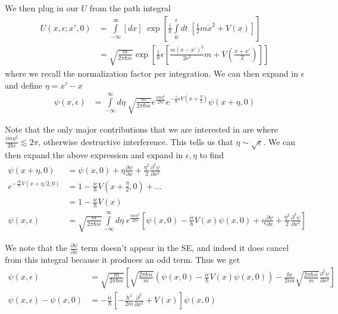 \documentclass[10pt]{report}
\newcommand{\pd}[2]{\frac{\partial #1}{\partial#2}}
\newcommand{\ptd}[2]{\frac{\partial^2 #1}{\partial#2^2}}
\begin{document}
We then plug in our $U$ from the path integral
\begin{align}
    U(x,\epsilon; x',0) &= \int\limits_{-\infty}^{\infty}[dx]\;\exp\left[ \frac{i}{\hbar}\int\limits_{0}^{\epsilon}dt\;\left[ \frac{1}{2}m\dot{x}^2 + V(x) \right] \right]\\
    &= \sqrt{\frac{m}{2\pi\hbar i\epsilon}}\exp\left[ \frac{i}{\hbar}\epsilon\left[ \frac{m(x-x')^2}{2\epsilon^2}m + V\left( \frac{x+x'}{2} \right) \right] \right]
\end{align}
where we recall the normalization factor per integration. We can then expand in $\epsilon$ and define $\eta = x' - x$
\begin{align}
    \psi(x,\epsilon) &= \int\limits_{-\infty}^{\infty}d\eta\;\sqrt{\frac{m}{2\pi\hbar i\epsilon}}e^{\frac{im\eta^2}{2\hbar\epsilon}} e^{-\frac{i}{\hbar}\epsilon V\left( x + \frac{\eta}{2} \right)}\psi(x + \eta,0)
\end{align}

Note that the only major contributions that we are interested in are where $\frac{im\eta^2}{2\hbar\epsilon} \lesssim 2\pi$, otherwise destructive interference. This tells us that $\eta \sim \sqrt{\epsilon}$. We can then expand the above expression and expand in $\epsilon,\eta$ to find
\begin{align}
    \psi(x + \eta,0) &= \psi(x,0) + \eta\pd{\psi}{x} + \frac{\eta^2}{2}\ptd{\psi}{x}\\
    e^{-\frac{i\hbar}{\epsilon }V(x + \eta/2,0)} &= 1 - \frac{i\epsilon}{\hbar}V\left( x + \frac{\eta}{2},0 \right) + \dots\\
    &= 1 - \frac{i\epsilon}{\hbar}V(x)\\
    \psi(x,\epsilon) &= \sqrt{\frac{m}{2\pi\hbar i\epsilon}}\int\limits_{-\infty}^{\infty}d\eta\;e^{\frac{im\eta^2}{2\hbar\epsilon}}\left[ \psi(x,0) - \frac{i\epsilon}{\hbar}V(x) \psi(x,0) + \eta \pd{\psi}{x} + \frac{\eta^2}{2}\ptd{\psi}{x}\right]
\end{align}

We note that the $\pd{\psi}{x}$ term doesn't appear in the SE, and indeed it does cancel from this integral because it produces an odd term. Thus we get
\begin{align}
    \psi(x,\epsilon) &= \sqrt{\frac{m}{2\pi\hbar i\epsilon}}\left[ \sqrt{\frac{2\pi \hbar i\epsilon}{m}}\left( \psi(x,0) - \frac{i\epsilon}{\hbar}V(x)\psi(x,0) \right) - \frac{\hbar\epsilon}{2im}\sqrt{\frac{2\pi\hbar i\epsilon}{m}}\ptd{\psi}{x} \right]\\
    \psi(x,\epsilon) - \psi(x,0) &= -\frac{i\epsilon}{\hbar}\left[ -\frac{\hbar^2}{2m}\ptd{}{x} + V(x)\right]\psi(x,0)
\end{align}
\end{document}
